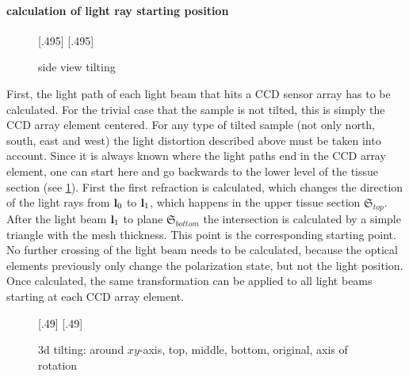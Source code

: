 \paragraph{calculation of light ray starting position}
% 
\begin{figure}[!t]
\def\tikzwidth{0.42\textwidth}
[.495\textwidth]{
\def\tilt{0}
\def\nindex{2.25}
}\hfill
{}[.495\textwidth]{
}
\caption{side view tilting}
\label{fig:tilted_side_view}
\end{figure}
% 
First, the light path of each light beam that hits a \ac{CCD} sensor array has to be calculated.
For the trivial case that the sample is not tilted, this is simply the \ac{CCD} array element centered.
For any type of tilted sample (not only north, south, east and west) the light distortion described above must be taken into account.
Since it is always known where the light paths end in the \ac{CCD} array element, one can start here and go backwards to the lower level of the tissue section (see \cref{fig:tilted_side_view}).
First the first refraction is calculated, which changes the direction of the light rays from $\mathbf{l}_0$ to $\mathbf{l}_1$, which happens in the upper tissue section $\mathfrak{S}_{top}$.
After the light beam $\mathbf{l}_1$ to plane $\mathfrak{S}_{bottom}$ the intersection is calculated by a simple triangle with the mesh thickness.
This point is the corresponding starting point.
No further crossing of the light beam needs to be calculated, because the optical elements previously only change the polarization state, but not the light position.
Once calculated, the same transformation can be applied to all light beams starting at each \ac{CCD} array element.
% 
\begin{figure}[!t]
\def\tikzheight{0.42\textwidth}
[.49\textwidth]{
}\hfill
{}[.49\textwidth]{
}
\tikzset{external/export=false}
\caption[3d tilting]{3d tilting: around $xy$-axis, \raisebox{.25em}{\tikz \draw[red,thick](0,0)--(0.25,0);} top, \raisebox{.25em}{\tikz \draw[green,thick](0,0)--(0.25,0);} middle, \raisebox{.25em}{\tikz \draw[blue,thick](0,0)--(0.25,0);} bottom, \raisebox{.25em}{\tikz \draw[dash pattern=on 1.25pt off 1.25pt,thick](0,0)--(0.25,0);} original, \raisebox{.25em}{\tikz \draw[gray](0,0)--(0.25,0);} axis of rotation }
\end{figure}
% 
\begin{lstfloat}[!t]
	
	\caption{Pseudocode simulation}
	\label{alg:simulation}
\end{lstfloat}
% 
% 
